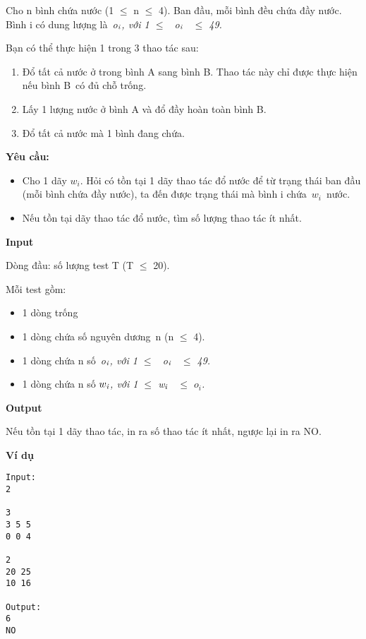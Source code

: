 

Cho n bình chứa nước (1  $\le$  n  $\le$  4). Ban đầu, mỗi bình đều chứa đầy nước. Bình i có dung lượng là \emph{o}$_\emph{i}$\emph{, với 1  $\le$  o}$_\emph{i}$\emph{  $\le$  49.}

Bạn có thể thực hiện 1 trong 3 thao tác sau:
\begin{enumerate}
	\item Đổ tất cả nước ở trong bình A sang bình B. Thao tác này chỉ được thực hiện nếu bình B có đủ chỗ trống.
	\item Lấy 1 lượng nước ở bình A và đổ đầy hoàn toàn bình B.
	\item Đổ tất cả nước mà 1 bình đang chứa.
\end{enumerate}

\textbf{Yêu cầu: }
\begin{itemize}
	\item Cho 1 dãy $w_{i}$. Hỏi có tồn tại 1 dãy thao tác đổ nước để từ trạng thái ban đầu (mỗi bình chứa đầy nước), ta đến được trạng thái mà bình i chứa $w_{i}$ nước.
	\item Nếu tồn tại dãy thao tác đổ nước, tìm số lượng thao tác ít nhất.
\end{itemize}

\textbf{Input}

Dòng đầu: số lượng test T (T  $\le$  20).

Mỗi test gồm:
\begin{itemize}
	\item 1 dòng trống
	\item 1 dòng chứa số nguyên dương n (n  $\le$  4).
	\item 1 dòng chứa n số \emph{o}$_\emph{i}$\emph{, với 1  $\le$  o}$_\emph{i}$\emph{  $\le$  49.}
	\item 1 dòng chứa n số $w_{\emph{i}}$\emph{, với 1  $\le$  w}$_\emph{i}$\emph{  $\le$  $o_{i}$.}
\end{itemize}

\textbf{Output}

Nếu tồn tại 1 dãy thao tác, in ra số thao tác ít nhất, ngược lại in ra NO.

\textbf{Ví dụ}
\begin{verbatim}
Input:
2

3
3 5 5
0 0 4

2
20 25
10 16

Output:
6
NO
\end{verbatim}
